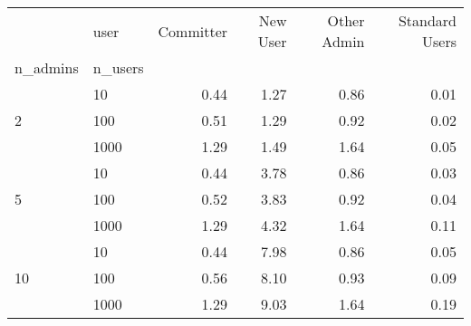 \begin{tabular}{llrrrr}
\toprule
 & user & Committer & New User & Other Admin & Standard Users \\
n_admins & n_users &  &  &  &  \\
\midrule
\multirow[t]{3}{*}{2} & 10 & 0.44 & 1.27 & 0.86 & 0.01 \\
 & 100 & 0.51 & 1.29 & 0.92 & 0.02 \\
 & 1000 & 1.29 & 1.49 & 1.64 & 0.05 \\
\cline{1-6}
\multirow[t]{3}{*}{5} & 10 & 0.44 & 3.78 & 0.86 & 0.03 \\
 & 100 & 0.52 & 3.83 & 0.92 & 0.04 \\
 & 1000 & 1.29 & 4.32 & 1.64 & 0.11 \\
\cline{1-6}
\multirow[t]{3}{*}{10} & 10 & 0.44 & 7.98 & 0.86 & 0.05 \\
 & 100 & 0.56 & 8.10 & 0.93 & 0.09 \\
 & 1000 & 1.29 & 9.03 & 1.64 & 0.19 \\
\cline{1-6}
\bottomrule
\end{tabular}
